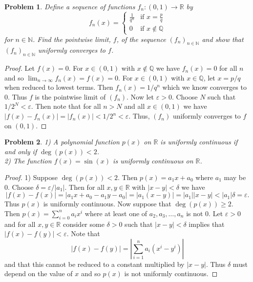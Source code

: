 \documentclass{article}
\newtheorem{problem}{Problem}
\begin{document}
\begin{flushleft}
\begin{problem}
Define a sequence of functions $f_n : (0,1) \rightarrow \mathbb{R}$ by
\[
f_n (x)=
\begin{cases}
\frac{1}{q^n} & \text{if $x = \frac{p}{q}$}\\
0 & \text{if $x \notin \mathbb{Q}$}
\end{cases}
\]
for $n \in \mathbb{N}$. Find the pointwise limit, $f$, of the sequence $(f_n)_{n \in \mathbb{N}}$ and show that $(f_n)_{n \in \mathbb{N}}$ uniformly converges to $f$.
\end{problem}
\begin{proof}
Let $f(x) = 0$. For $x \in (0,1)$ with $x \notin \mathbb{Q}$ we have $f_n(x) = 0$ for all $n$ and so $\lim_{n \rightarrow \infty} f_n(x) = f(x) = 0$. For $x \in (0,1)$ with $x \in \mathbb{Q}$, let $x = p/q$ when reduced to lowest terms. Then $f_n(x) = 1/q^n$ which we know converges to $0$. Thus $f$ is the pointwise limit of $(f_n)$. Now let $\varepsilon > 0$. Choose $N$ such that $1/2^N < \varepsilon$. Then note that for all $n > N$ and all $x \in (0,1)$ we have $|f(x) - f_n(x)| = |f_n(x)| < 1/2^n < \varepsilon$. Thus, $(f_n)$ uniformly converges to $f$ on $(0,1)$.
\end{proof}

\begin{problem}
1) A polynomial function $p(x)$ on $\mathbb{R}$ is uniformly continuous if and only if $\deg(p(x)) < 2$.\\
2) The function $f(x) = \sin (x)$ is uniformly continuous on $\mathbb{R}$.
\end{problem}
\begin{proof}
1) Suppose $\deg(p(x)) < 2$. Then $p(x) = a_1x + a_0$ where $a_1$ may be $0$. Choose $\delta = \varepsilon/|a_1|$. Then for all $x, y \in \mathbb{R}$ with $|x-y| < \delta$ we have
\[
|f(x) - f(x)| = |a_1x + a_0 - a_1y - a_0| = |a_1(x - y)| = |a_1||x-y| < |a_1|\delta = \varepsilon.
\]
Thus $p(x)$ is uniformly continuous. Now suppose that $\deg(p(x)) \geq 2$. Then $p(x) = \sum_{i=0}^{n} a_ix^i$ where at least one of $a_2, a_3, \dots , a_n$ is not $0$. Let $\varepsilon > 0$ and for all $x,y \in \mathbb{R}$ consider some $\delta > 0$ such that $|x-y| < \delta$ implies that $|f(x) - f(y)| < \varepsilon$. Note that
\[
|f(x) - f(y)| = |\sum_{i=1}^{n} a_i(x^i-y^i)|
\]
and that this cannot be reduced to a constant multiplied by $|x-y|$. Thus $\delta$ must depend on the value of $x$ and so $p(x)$ is not uniformly continuous.\newline


\end{proof}
\end{flushleft}
\end{document}
